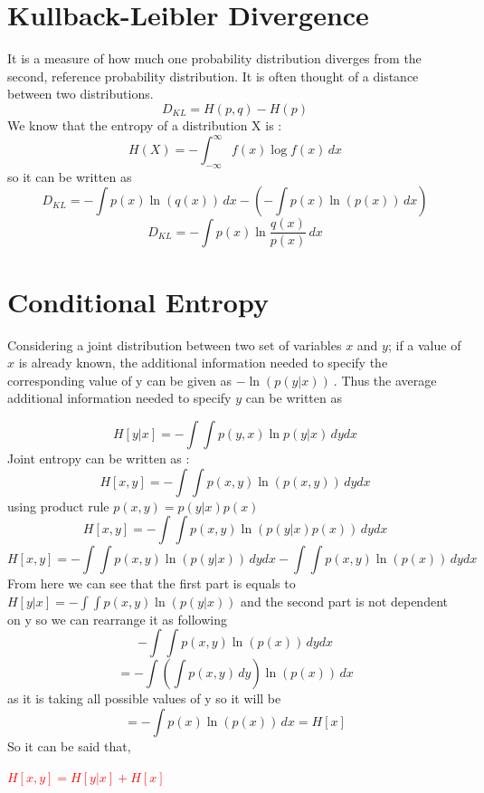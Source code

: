 \documentclass[11pt,a4paper]{article}
\begin{document}
\section{Kullback-Leibler Divergence}
It is a measure of how much one probability distribution diverges from the second, reference probability distribution. It is often thought of a distance between two distributions. 
\begin{equation}
D_{KL} = H(p,q) - H(p)
\end{equation}
We know that the entropy of a distribution X is :
\begin{equation}
H(X) = -\int_{-\infty}^{\infty} f(x) \log f(x) \, dx
\end{equation}
so it can be written as 
\begin{equation}
D_{KL} = - \int p(x) \ln(q(x)) \, dx - \left( - \int p(x) \ln(p(x)) \, dx \right)
\end{equation}
\begin{equation}
D_{KL} = -\int p(x) \ln{\frac{q(x)}{p(x)}} \, dx
\end{equation}
\section{Conditional Entropy}
Considering a joint distribution between two set of variables $x$ and $y$; if a value of $x$ is already known, the additional information needed to specify the corresponding value of y can be given as $- \ln(p(y|x)) \ $. Thus the average additional information needed to specify $y$ can be written as

\begin{equation}
H[y|x] = - \int \int p(y,x) \ln p(y|x) \, dy dx
\end{equation}
Joint entropy can be written as :
\begin{equation}
H[x,y] = - \int \int p(x,y) \ln(p(x,y)) \, dy dx
\end{equation}
using product rule  $p(x,y) = p(y|x)p(x)$
\begin{equation}
H[x,y] = - \int \int p(x,y) \ln(p(y|x)p(x)) \, dy dx
\end{equation}
\begin{equation}
H[x,y] = - \int \int p(x,y) \ln(p(y|x)) \, dy dx - \int \int p(x,y) \ln(p(x)) \, dy dx
\end{equation}
From here we can see that the first part is equals to  $H[y|x] = - \int \int p(x,y) \ln(p(y|x))$  and the second part is not dependent on y so we can rearrange it as following 
\begin{equation}
- \int \int p(x,y) \ln(p(x))\, dy dx
\end{equation}
\begin{equation}
= - \int \left( \int p(x,y) \, dy \right) \ln(p(x)) \, dx
\end{equation}
as it is taking all possible values of y so it will be 
\begin{equation}
= - \int p(x) \ln(p(x)) \, dx = H[x]
\end{equation}
So it can be said that, 
\begin{center}
\textcolor{red}{ $H[x,y] = H[y|x] + H[x]$}
\end{center}
\end{document}

